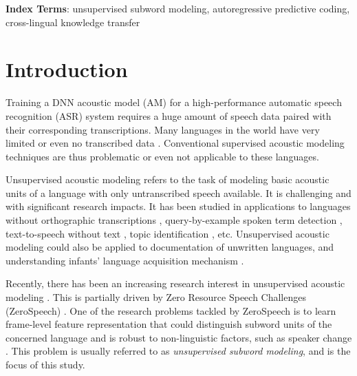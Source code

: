\documentclass[a4paper]{article}
\begin{document}
\noindent\textbf{Index Terms}: unsupervised subword modeling, autoregressive predictive coding, cross-lingual knowledge transfer

\section{Introduction}

Training a DNN acoustic model (AM) for a high-performance automatic speech recognition (ASR) system requires a huge amount of speech data paired with their corresponding transcriptions. 
Many languages in the world have very limited or even no transcribed data \cite{dunbar2017zero}. 
Conventional supervised acoustic modeling techniques are thus problematic or even not applicable to these languages.

Unsupervised acoustic modeling refers to the task of modeling basic acoustic units of a language with only untranscribed speech available. It is  challenging and  with significant research impacts. It has been studied in applications to languages without orthographic transcriptions \cite{I3EWang}, query-by-example spoken term detection \cite{Chen+2016}, text-to-speech without text \cite{Dunbar2019}, topic identification \cite{SiuGishChanEtAl2014}, etc. Unsupervised acoustic modeling could also be applied to documentation of unwritten languages, and understanding infants' language acquisition mechanism \cite{versteegh2015zero}. 

Recently, there has been an increasing  research interest in unsupervised acoustic modeling \cite{chen2015parallel,heck2017feature,Kamper2017segmental,Tjandra2019,Feng2019combining,Ondel2019Bayesian}. This is partially driven by Zero Resource Speech Challenges (ZeroSpeech) \cite{versteegh2015zero,dunbar2017zero,Dunbar2019}.
One of the research problems tackled by ZeroSpeech is to learn frame-level feature representation that could distinguish subword units of the concerned language and is robust to non-linguistic factors, such as speaker change \cite{versteegh2015zero,dunbar2017zero}. This problem is usually referred to as \textit{unsupervised subword modeling}, and is the focus of this study. 
\end{document}
